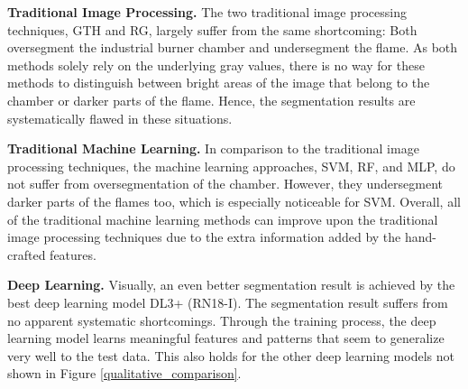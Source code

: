 \documentclass{isprs} %
\begin{document}
\textbf{Traditional Image Processing.} The two traditional image processing techniques, GTH and RG, largely suffer from the same shortcoming: Both oversegment the industrial burner chamber and undersegment the flame. As both methods solely rely on the underlying gray values, there is no way for these methods to distinguish between bright areas of the image that belong to the chamber or darker parts of the flame. Hence, the segmentation results are systematically flawed in these situations. 

\textbf{Traditional Machine Learning.} In comparison to the traditional image processing techniques, the machine learning approaches, SVM, RF, and MLP, do not suffer from oversegmentation of the chamber. However, they undersegment darker parts of the flames too, which is especially noticeable for SVM. Overall, all of the traditional machine learning methods can improve upon the traditional image processing techniques due to the extra information added by the hand-crafted features.

\textbf{Deep Learning.} Visually, an even better segmentation result is achieved by the best deep learning model DL3+ (RN18-I). The segmentation result suffers from no apparent systematic shortcomings. Through the training process, the deep learning model learns meaningful features and patterns that seem to generalize very well to the test data. This also holds for the other deep learning models not shown in Figure \ref{qualitative_comparison}.
\end{document}
